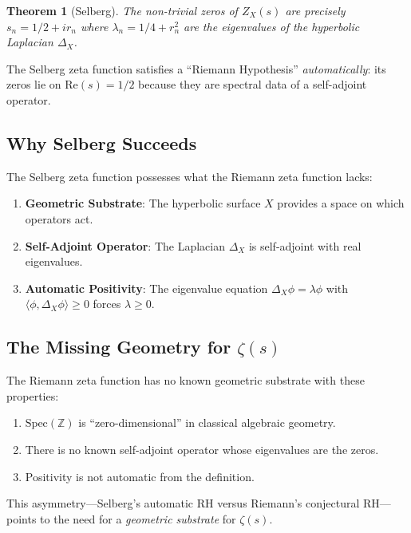 \documentclass[12pt, a4paper]{article}
\newtheorem{theorem}{Theorem}[section]
\theoremstyle{definition}
\newcommand{\Z}{\mathbb{Z}}
\newcommand{\Spec}{\mathrm{Spec}}
\newcommand{\re}{\mathrm{Re}}
\begin{document}
\begin{theorem}[Selberg]
The non-trivial zeros of $Z_X(s)$ are precisely $s_n = 1/2 + ir_n$ where $\lambda_n = 1/4 + r_n^2$ are the eigenvalues of the hyperbolic Laplacian $\Delta_X$.
\end{theorem}

The Selberg zeta function satisfies a ``Riemann Hypothesis'' \textit{automatically}: its zeros lie on $\re(s) = 1/2$ because they are spectral data of a self-adjoint operator.

\subsection{Why Selberg Succeeds}

The Selberg zeta function possesses what the Riemann zeta function lacks:

\begin{enumerate}
\item \textbf{Geometric Substrate}: The hyperbolic surface $X$ provides a space on which operators act.
\item \textbf{Self-Adjoint Operator}: The Laplacian $\Delta_X$ is self-adjoint with real eigenvalues.
\item \textbf{Automatic Positivity}: The eigenvalue equation $\Delta_X \phi = \lambda \phi$ with $\langle \phi, \Delta_X \phi \rangle \geq 0$ forces $\lambda \geq 0$.
\end{enumerate}

\subsection{The Missing Geometry for $\zeta(s)$}

The Riemann zeta function has no known geometric substrate with these properties:

\begin{enumerate}
\item $\Spec(\Z)$ is ``zero-dimensional'' in classical algebraic geometry.
\item There is no known self-adjoint operator whose eigenvalues are the zeros.
\item Positivity is not automatic from the definition.
\end{enumerate}

This asymmetry---Selberg's automatic RH versus Riemann's conjectural RH---points to the need for a \textit{geometric substrate} for $\zeta(s)$.

\end{document}
